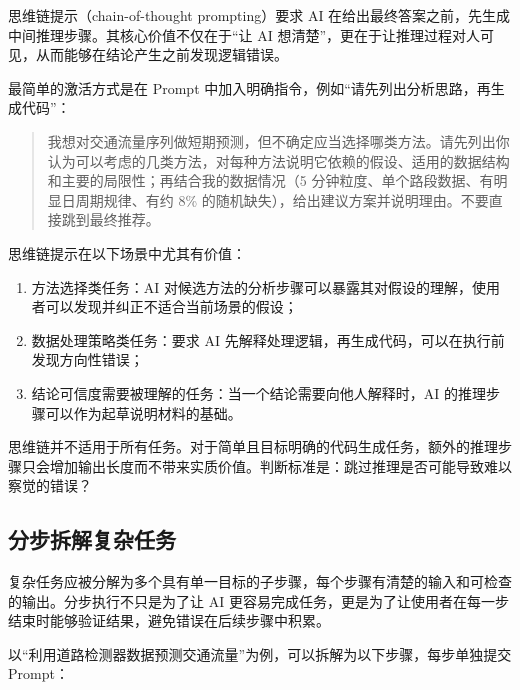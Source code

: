 思维链提示（chain-of-thought prompting）要求 AI 在给出最终答案之前，先生成中间推理步骤。其核心价值不仅在于“让 AI 想清楚”，更在于让推理过程对人可见，从而能够在结论产生之前发现逻辑错误。

最简单的激活方式是在 Prompt 中加入明确指令，例如“请先列出分析思路，再生成代码”：

\begin{quote}
我想对交通流量序列做短期预测，但不确定应当选择哪类方法。请先列出你认为可以考虑的几类方法，对每种方法说明它依赖的假设、适用的数据结构和主要的局限性；再结合我的数据情况（5 分钟粒度、单个路段数据、有明显日周期规律、有约 8\% 的随机缺失），给出建议方案并说明理由。不要直接跳到最终推荐。
\end{quote}

思维链提示在以下场景中尤其有价值：

\begin{enumerate}
  \item 方法选择类任务：AI 对候选方法的分析步骤可以暴露其对假设的理解，使用者可以发现并纠正不适合当前场景的假设；
  \item 数据处理策略类任务：要求 AI 先解释处理逻辑，再生成代码，可以在执行前发现方向性错误；
  \item 结论可信度需要被理解的任务：当一个结论需要向他人解释时，AI 的推理步骤可以作为起草说明材料的基础。
\end{enumerate}

思维链并不适用于所有任务。对于简单且目标明确的代码生成任务，额外的推理步骤只会增加输出长度而不带来实质价值。判断标准是：跳过推理是否可能导致难以察觉的错误？

\subsection{分步拆解复杂任务}
\label{sec:decomposition}

复杂任务应被分解为多个具有单一目标的子步骤，每个步骤有清楚的输入和可检查的输出。分步执行不只是为了让 AI 更容易完成任务，更是为了让使用者在每一步结束时能够验证结果，避免错误在后续步骤中积累。

以“利用道路检测器数据预测交通流量”为例，可以拆解为以下步骤，每步单独提交 Prompt：

